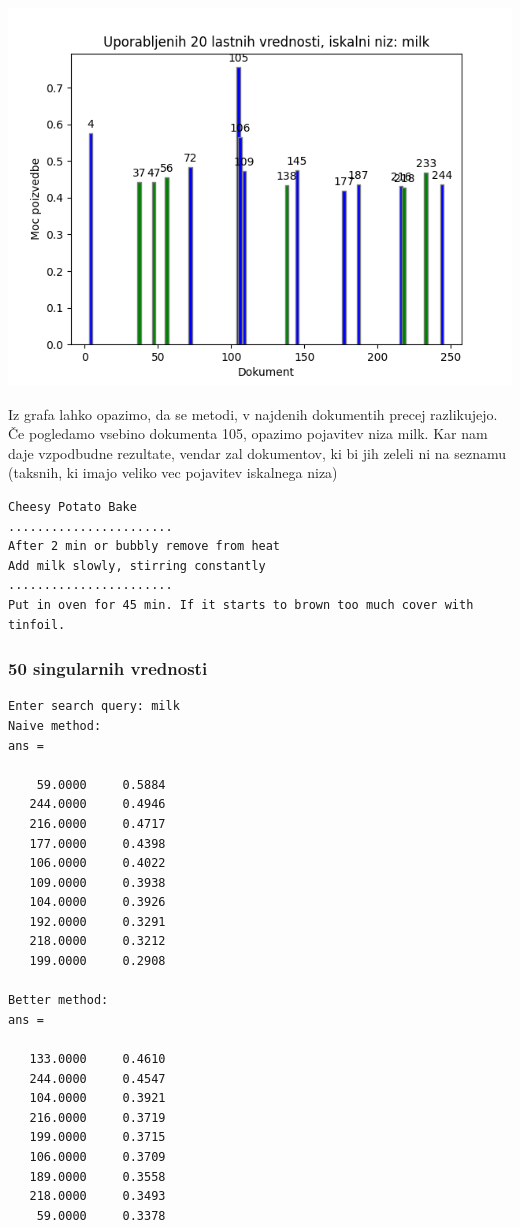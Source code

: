 \documentclass{article}
\begin{document}
\begin{center}
    \includegraphics[scale=0.65]{../graphs/generated_graphs/graph_20_singular_values_used.png}    
\end{center}


Iz grafa lahko opazimo, da se metodi, v najdenih dokumentih precej razlikujejo. Če pogledamo vsebino dokumenta 105, opazimo pojavitev niza milk. Kar nam daje vzpodbudne rezultate, vendar zal dokumentov, ki 
bi jih zeleli ni na seznamu (taksnih, ki imajo veliko vec pojavitev iskalnega niza)
\begin{verbatim}
Cheesy Potato Bake
.......................
After 2 min or bubbly remove from heat
Add milk slowly, stirring constantly
.......................
Put in oven for 45 min. If it starts to brown too much cover with tinfoil.
\end{verbatim}


\subsubsection{50 singularnih vrednosti}

\begin{small}
\begin{verbatim}
Enter search query: milk
Naive method:
ans =

    59.0000     0.5884
   244.0000     0.4946
   216.0000     0.4717
   177.0000     0.4398
   106.0000     0.4022
   109.0000     0.3938
   104.0000     0.3926
   192.0000     0.3291
   218.0000     0.3212
   199.0000     0.2908

Better method:
ans =

   133.0000     0.4610
   244.0000     0.4547
   104.0000     0.3921
   216.0000     0.3719
   199.0000     0.3715
   106.0000     0.3709
   189.0000     0.3558
   218.0000     0.3493
    59.0000     0.3378    
\end{verbatim}
\end{small}
\end{document}

